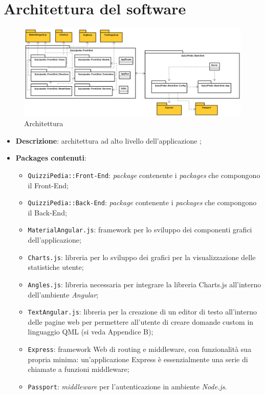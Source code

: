 \newpage

\section{Architettura del software}
\label{Architettura}
\begin{figure}[ht]
	\centering
	\includegraphics[scale=0.35]{UML/Package/QuizziPedia.png}
	\caption{Architettura}
\end{figure}
\FloatBarrier
\begin{itemize}
	\item \textbf{Descrizione}: architettura ad alto livello dell'applicazione \progetto;
	\item \textbf{Packages contenuti}:
	\begin{itemize}
		\item \texttt{QuizziPedia::Front-End}: \textit{package} contenente i \textit{packages} che compongono il Front-End;
		\item \texttt{QuizziPedia::Back-End}: \textit{package} contenente i \textit{packages} che compongono il Back-End;
		\item \texttt{MaterialAngular.js}: framework per lo sviluppo dei componenti grafici dell'applicazione;
		\item \texttt{Charts.js}: libreria per lo sviluppo dei grafici per la visualizzazione delle statistiche utente;
		\item \texttt{Angles.js}: libreria necessaria per integrare la libreria Charts.js all'interno dell'ambiente \textit{Angular};
		\item \texttt{TextAngular.js}: libreria per la creazione di un editor di testo all'interno delle pagine web per permettere all'utente di creare domande custom in linguaggio QML (si veda Appendice B);
		\item \texttt{Express}: framework Web di routing e middleware, con funzionalità sua propria minima: un’applicazione Express è essenzialmente una serie di chiamate a funzioni middleware;
		\item \texttt{Passport}: \textit{middleware} per l'autenticazione in ambiente \textit{Node.js}.
	\end{itemize}
\end{itemize}

